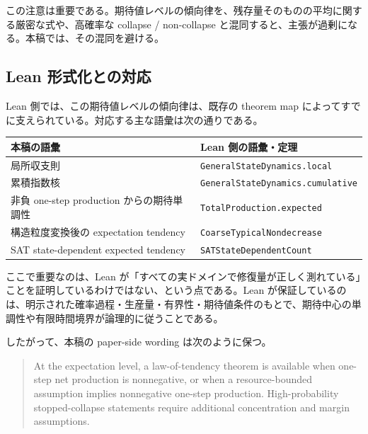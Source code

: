 \documentclass[12pt,a4paper]{article}
\begin{document}
この注意は重要である。期待値レベルの傾向律を、残存量そのものの平均に関する厳密な式や、高確率な collapse / non-collapse と混同すると、主張が過剰になる。本稿では、その混同を避ける。

\subsection{Lean 形式化との対応}\label{lean-ux5f62ux5f0fux5316ux3068ux306eux5bfeux5fdc}

Lean 側では、この期待値レベルの傾向律は、既存の theorem map によってすでに支えられている。対応する主な語彙は次の通りである。

{\def\LTcaptype{table} %
\begin{longtable}[]{@{}
  >{\raggedright\arraybackslash}p{}
  >{\raggedright\arraybackslash}p{}@{}}
\toprule\noalign{}
\begin{minipage}[b]{\linewidth}\raggedright
本稿の語彙
\end{minipage} & \begin{minipage}[b]{\linewidth}\raggedright
Lean 側の語彙・定理
\end{minipage} \\
\midrule\noalign{}
\endhead
\bottomrule\noalign{}
\endlastfoot
局所収支則 & \texttt{GeneralStateDynamics.local} \\
累積指数核 & \texttt{GeneralStateDynamics.cumulative} \\
非負 one-step production からの期待単調性 & \texttt{TotalProduction.expected} \\
構造粒度変換後の expectation tendency & \texttt{CoarseTypicalNondecrease} \\
SAT state-dependent expected tendency & \texttt{SATStateDependentCount} \\
\end{longtable}
}

ここで重要なのは、Lean が「すべての実ドメインで修復量が正しく測れている」ことを証明しているわけではない、という点である。Lean が保証しているのは、明示された確率過程・生産量・有界性・期待値条件のもとで、期待中心の単調性や有限時間境界が論理的に従うことである。

したがって、本稿の paper-side wording は次のように保つ。

\begin{quote}
At the expectation level, a law-of-tendency theorem is available when one-step net production is nonnegative, or when a resource-bounded assumption implies nonnegative one-step production. High-probability stopped-collapse statements require additional concentration and margin assumptions.
\end{quote}
\end{document}
